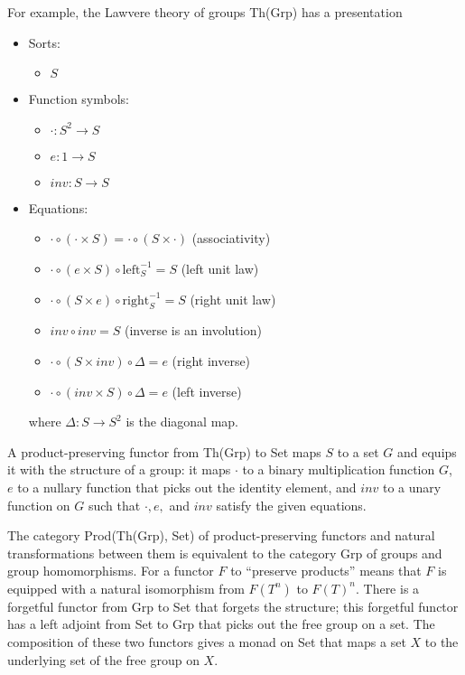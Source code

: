 \documentclass{article}
\newcommand{\maps}{\colon}
\begin{document}
For example, the Lawvere theory of groups Th(Grp) has a presentation
\begin{center}
  \begin{itemize}
    \item Sorts:
    \begin{itemize}
      \item $S$
    \end{itemize}
    \item Function symbols:
    \begin{itemize}
      \item $\cdot\maps S^2 \to S$
      \item $e\maps 1 \to S$
      \item $inv \maps S \to S$
    \end{itemize}
    \item Equations:
    \begin{itemize}
      \item $\cdot \circ (\cdot \times S) = \cdot \circ (S \times \cdot)$ (associativity)
      \item $\cdot \circ (e \times S) \circ \mathrm{left}^{-1}_S = S$ (left unit law)
      \item $\cdot \circ (S \times e) \circ \mathrm{right}^{-1}_S = S$ (right unit law)
      \item $inv \circ inv = S$ (inverse is an involution)
      \item $\cdot \circ (S \times inv) \circ \Delta = e$ (right inverse)
      \item $\cdot \circ (inv \times S) \circ \Delta = e$ (left inverse)
    \end{itemize}
    where ${\Delta\maps S \to S^2}$ is the diagonal map.
  \end{itemize}
\end{center}

A product-preserving functor from Th(Grp) to Set maps $S$ to a set $G$ and equips it with the structure of a group: it maps $\cdot$ to a binary multiplication function $G$, $e$ to a nullary function that picks out the identity element, and $inv$ to a unary function on $G$ such that $\cdot, e,$ and $inv$ satisfy the given equations.

The category Prod(Th(Grp), Set) of product-preserving functors and natural transformations between them is equivalent to the category Grp of groups and group homomorphisms.  For a functor $F$ to ``preserve products'' means that $F$ is equipped with a natural isomorphism from $F(T^n)$ to $F(T)^n.$  There is a forgetful functor from Grp to Set that forgets the structure; this forgetful functor has a left adjoint from Set to Grp that picks out the free group on a set.  The composition of these two functors gives a monad on Set that maps a set $X$ to the underlying set of the free group on $X.$
\end{document}
